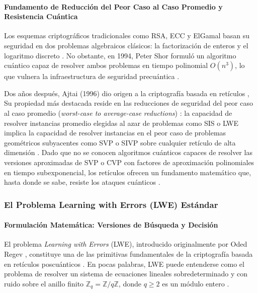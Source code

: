\paragraph{Fundamento de Reducción del Peor Caso al Caso Promedio y Resistencia Cuántica}

Los esquemas criptográficos tradicionales como RSA, ECC y ElGamal basan su seguridad en dos problemas algebraicos clásicos: la factorización de enteros y el logaritmo discreto \cite{huang2018lattice, nguyen2019high, rewal2023quantumsafe, mukil2026implementing}. No obstante, en 1994, Peter Shor formuló un algoritmo cuántico capaz de resolver ambos problemas en tiempo polinomial $O(n^3)$, lo que vulnera la infraestructura de seguridad precuántica \cite{huang2018lattice, rewal2023quantumsafe, mukil2026implementing}.

Dos años después, Ajtai (1996) dio origen a la criptografía basada en retículos \cite{huang2018lattice, rewal2023quantumsafe}, Su propiedad más destacada reside en las reducciones de seguridad del peor caso al caso promedio (\textit{worst-case to average-case reductions}) \cite{rewal2023quantumsafe, an2023secrethandshakes}: la capacidad de resolver instancias promedio elegidas al azar de problemas como SIS o LWE implica la capacidad de resolver instancias en el peor caso de problemas geométricos subyacentes como SVP o SIVP sobre cualquier retículo de alta dimensión \cite{rewal2023quantumsafe, an2023secrethandshakes}. Dado que no se conocen algoritmos cuánticos capaces de resolver las versiones aproximadas de SVP o CVP con factores de aproximación polinomiales en tiempo subexponencial, los retículos ofrecen un fundamento matemático que, hasta donde se sabe, resiste los ataques cuánticos \cite{huang2018lattice, nguyen2019high, rewal2023quantumsafe, ma2026laasso, mukil2026implementing, yang2025multiserver}.


\subsubsection{El Problema Learning with Errors (LWE) Estándar}

\paragraph{Formulación Matemática: Versiones de Búsqueda y Decisión}

El problema \textit{Learning with Errors} (LWE), introducido originalmente por Oded Regev \cite{regev2009lwe}, constituye una de las primitivas fundamentales de la criptografía basada en retículos poscuánticos \cite{mukil2026implementing}. En pocas palabras, LWE puede entenderse como el problema de resolver un sistema de ecuaciones lineales sobredeterminado y con ruido sobre el anillo finito $\mathbb{Z}_q = \mathbb{Z}/q\mathbb{Z}$, donde $q \ge 2$ es un módulo entero \cite{regev2009lwe, yang2025multiserver}.

